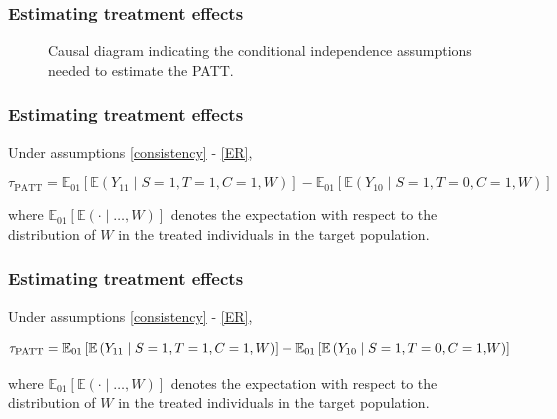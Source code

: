 \documentclass{beamer}
\newcommand{\ex}{\mathbb{E}} %
\newcommand{\tikzmark}[1]{\tikz[overlay,remember picture] \node (#1) {};}
\begin{document}
\begin{frame}
\frametitle{Estimating treatment effects}
\begin{figure}[h]
\caption{Causal diagram indicating the conditional independence assumptions needed to estimate the PATT.}\label{fig:DAG}
\end{figure}

\end{frame}


\begin{frame}
\frametitle{Estimating treatment effects}
\begin{theorem}\label{thm1}
\fontsize{9pt}{7.2}\selectfont
Under assumptions \eqref{consistency} - \eqref{ER},

$$\tau_{\text{PATT}} = \ex_{01}\left[  \ex\left(Y_{11} \mid S=1, T=1, C=1, W\right)\right]
-\ex_{01}\left[  \ex\left(Y_{10} \mid S=1,T=0, C=1, W\right) \right] $$

where $\ex_{01}\left[\ex(\cdot \mid\dots, W)\right]$ denotes the expectation with respect to the distribution of $W$ in the treated individuals in the target population.  
\end{theorem}
\end{frame}



\begin{frame}
\frametitle{Estimating treatment effects}
\begin{theorem}\label{thm1}
\fontsize{9pt}{7.2}\selectfont
Under assumptions \eqref{consistency} - \eqref{ER},

$$\tau_{\text{PATT}} = \ex_{01}\left[  \ex\left(Y_{11} \mid S=1, T=1, C=1, W\right)\right]
-\ex_{01}\left[  \ex\left(Y_{10} \mid S=1, \tikzmark{unobserved}{T=0, C=1,} W\right) \right] $$

where $\ex_{01}\left[\ex(\cdot \mid\dots, W)\right]$ denotes the expectation with respect to the distribution of $W$ in the treated individuals in the target population.  
\end{theorem}
\end{frame}
\end{document}
